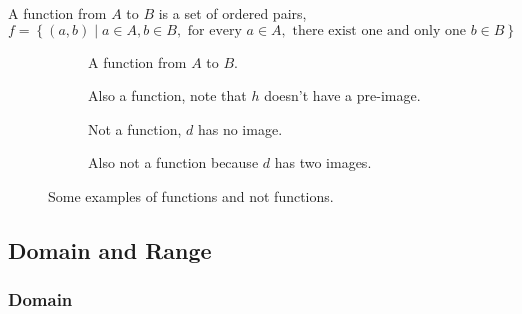
\begin{definition}
    \label{def: function}
    A function from \(A\) to \(B\) is a set of ordered pairs, \[
        f = \left\{(a,b) \mid a \in A, b \in B, \text{ for every } a \in A, \text{ there
        exist one and only one } b \in B \right\}
    \]
\end{definition}



\begin{figure}[H]
    \begin{subfigure}{.5\textwidth}
        \centering
        \caption{A function from \(A\) to \(B\).}
    \end{subfigure}%
    \begin{subfigure}{.5\textwidth}
        \centering
        \caption{Also a function, note that \(h\) doesn't have a pre-image.}
    \end{subfigure}
    \begin{subfigure}{.5\textwidth}
        \centering
        \caption{Not a function, \(d\) has no image.}
    \end{subfigure}
    \begin{subfigure}{.5\textwidth}
        \centering
        \caption{Also not a function because \(d\) has two images.}
    \end{subfigure}
    \caption{Some examples of functions and not functions.}
\end{figure}

\subsection{Domain and Range}

\subsubsection{Domain}

